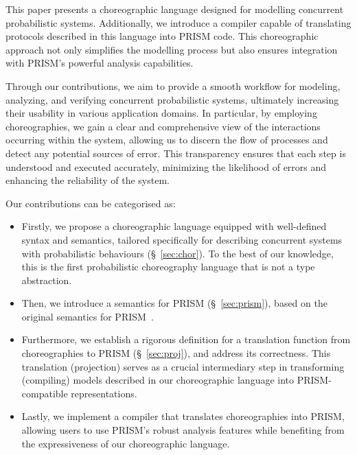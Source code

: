 This paper presents a choreographic language designed for modelling
concurrent probabilistic systems.
Additionally, we introduce a compiler capable of translating protocols
described in this language into PRISM code. This choreographic
approach not only simplifies the modelling process but also ensures
integration with PRISM's powerful analysis capabilities. 




Through our contributions, we aim to provide a smooth workflow for
modeling, analyzing, and verifying concurrent probabilistic systems,
ultimately increasing their usability in various application domains.
%
In particular, by employing choreographies, we gain a clear and
comprehensive view of the interactions occurring within the system,
allowing us to discern the flow of processes and detect any potential
sources of error. This transparency ensures that each step is
understood and executed accurately, minimizing the likelihood of
errors and enhancing the reliability of the system.


 Our contributions can be
categorised as:
\begin{itemize} 
\item Firstly, we propose a choreographic language equipped with
  well-defined syntax and semantics, tailored specifically for
  describing concurrent systems with probabilistic behaviours
  (\S~\ref{sec:chor}). To the best of our knowledge, this is the first
  probabilistic choreography language that is not a type abstraction.
\item Then, we introduce a semantics for PRISM (\S~\ref{sec:prism}),
  based on the original semantics for PRISM~\cite{PRISMdoc}.
\item Furthermore, we establish a rigorous definition for a
  translation function from choreographies to PRISM
  (\S~\ref{sec:proj}), and address its correctness. This translation
  (projection) serves as a crucial intermediary step in transforming
  (compiling) models described in our choreographic language into
  PRISM-compatible representations.
\item Lastly, we implement a compiler that translates choreographies
  into PRISM, allowing users to use PRISM's robust analysis features
  while benefiting from the expressiveness of our choreographic
  language.
\end{itemize}



